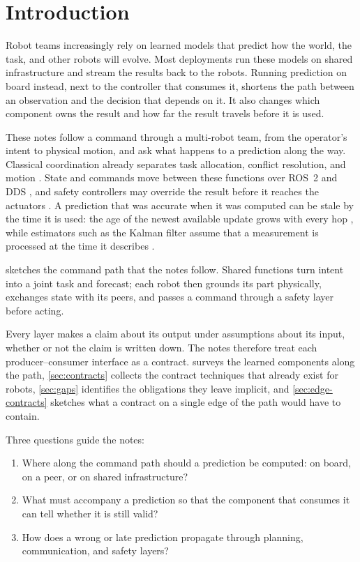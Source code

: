 \section{Introduction}
\label{sec:introduction}

Robot teams increasingly rely on learned models that predict how the world, the
task, and other robots will evolve.  Most deployments run these models on shared
infrastructure and stream the results back to the robots.  Running prediction on
board instead, next to the controller that consumes it, shortens the path
between an observation and the decision that depends on it.  It also changes
which component owns the result and how far the result travels before it is
used.

These notes follow a command through a multi-robot team, from the operator's
intent to physical motion, and ask what happens to a prediction along the way.
Classical coordination already separates task allocation, conflict resolution,
and motion \cite{gerkey2004mrta,choi2009cbba,sharon2015cbs}.  State and commands
move between these functions over ROS~2 and DDS
\cite{macenski2022ros2,omg2015dds}, and safety controllers may override the
result before it reaches the actuators \cite{wang2017barrier}.  A prediction
that was accurate when it was computed can be stale by the time it is used: the
age of the newest available update grows with every hop \cite{kaul2012aoi},
while estimators such as the Kalman filter assume that a measurement is
processed at the time it describes \cite{kalman1960}.

 sketches the command path that the notes follow.
Shared functions turn intent into a joint task and forecast; each robot then
grounds its part physically, exchanges state with its peers, and passes a
command through a safety layer before acting.



Every layer makes a claim about its output under assumptions about its input,
whether or not the claim is written down.  The notes therefore treat each
producer--consumer interface as a contract.   surveys the
learned components along the path, \cref{sec:contracts} collects the contract
techniques that already exist for robots, \cref{sec:gaps} identifies the
obligations they leave implicit, and \cref{sec:edge-contracts} sketches what a
contract on a single edge of the path would have to contain.

Three questions guide the notes:
\begin{enumerate}
  \item Where along the command path should a prediction be computed: on board,
    on a peer, or on shared infrastructure?
  \item What must accompany a prediction so that the component that consumes it
    can tell whether it is still valid?
  \item How does a wrong or late prediction propagate through planning,
    communication, and safety layers?
\end{enumerate}
